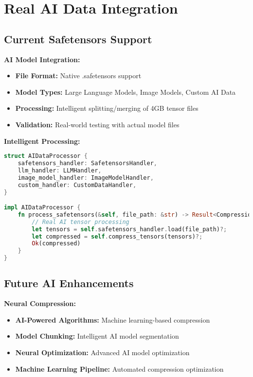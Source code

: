 \documentclass[12pt,a4paper]{article}
\begin{document}
\section{Real AI Data Integration}

\subsection{Current Safetensors Support}

\textbf{AI Model Integration:}
\begin{itemize}
    \item \textbf{File Format:} Native .safetensors support
    \item \textbf{Model Types:} Large Language Models, Image Models, Custom AI Data
    \item \textbf{Processing:} Intelligent splitting/merging of 4GB tensor files
    \item \textbf{Validation:} Real-world testing with actual model files
\end{itemize}

\textbf{Intelligent Processing:}
\begin{lstlisting}[language=Rust, caption=AI Data Processing]
struct AIDataProcessor {
    safetensors_handler: SafetensorsHandler,
    llm_handler: LLMHandler,
    image_model_handler: ImageModelHandler,
    custom_handler: CustomDataHandler,
}

impl AIDataProcessor {
    fn process_safetensors(&self, file_path: &str) -> Result<CompressionResult> {
        // Real AI tensor processing
        let tensors = self.safetensors_handler.load(file_path)?;
        let compressed = self.compress_tensors(tensors)?;
        Ok(compressed)
    }
}
\end{lstlisting}

\subsection{Future AI Enhancements}

\textbf{Neural Compression:}
\begin{itemize}
    \item \textbf{AI-Powered Algorithms:} Machine learning-based compression
    \item \textbf{Model Chunking:} Intelligent AI model segmentation
    \item \textbf{Neural Optimization:} Advanced AI model optimization
    \item \textbf{Machine Learning Pipeline:} Automated compression optimization
\end{itemize}
\end{document}
